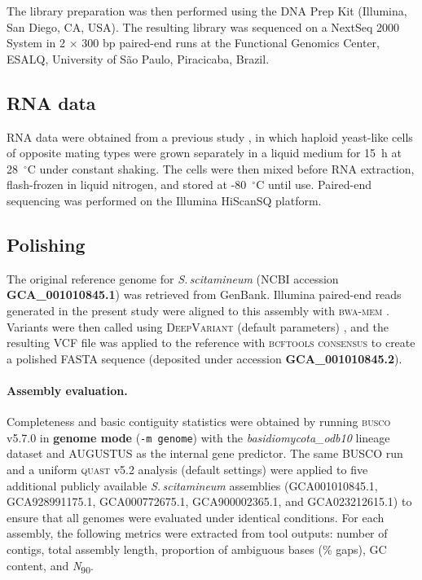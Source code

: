 \documentclass[Journal,letterpaper]{ascelike-new}
\begin{document}
The library preparation was then performed using the DNA Prep Kit (Illumina, San Diego, CA, USA). The resulting library was sequenced on a NextSeq 2000 System in 2 $\times$ 300 bp paired-end runs at the Functional Genomics Center, ESALQ, University of São Paulo, Piracicaba, Brazil.

\subsection*{RNA data}

RNA data were obtained from a previous study \cite{sscita2015}, in which haploid yeast-like cells of opposite mating types were grown separately in a liquid medium for 15~h at 28~$^{\circ}$C under constant shaking. The cells were then mixed before RNA extraction, flash-frozen in liquid nitrogen, and stored at -80~$^{\circ}$C until use. Paired-end sequencing was performed on the Illumina HiScanSQ platform.

\subsection*{Polishing}

The original reference genome for \textit{S.\,scitamineum} (NCBI accession \textbf{GCA\_001010845.1}) \cite{sscita2015} was retrieved from GenBank. Illumina paired-end reads generated in the present study were aligned to this assembly with \textsc{bwa-mem} \cite{bwamem}. Variants were then called using \textsc{DeepVariant} (default parameters) \cite{deepvariant2018}, and the resulting VCF file was applied to the reference with \textsc{bcftools consensus} \cite{samtools} to create a polished FASTA sequence (deposited under accession \textbf{GCA\_001010845.2}).

\paragraph{Assembly evaluation.} Completeness and basic contiguity statistics were obtained by running \textsc{busco} v5.7.0 \cite{busco} in \textbf{genome mode} (\texttt{-m genome}) with the \textit{basidiomycota\_odb10} lineage dataset and \textsc{AUGUSTUS} as the internal gene predictor. The same BUSCO run and a uniform \textsc{quast} v5.2 analysis (default settings) were applied to five additional publicly available \textit{S.\,scitamineum} assemblies (GCA001010845.1, GCA928991175.1, GCA000772675.1, GCA900002365.1, and GCA023212615.1) to ensure that all genomes were evaluated under identical conditions. For each assembly, the following metrics were extracted from tool outputs: number of contigs, total assembly length, proportion of ambiguous bases (\% gaps), GC content, and \textit{N}\textsubscript{90}.
\end{document}
